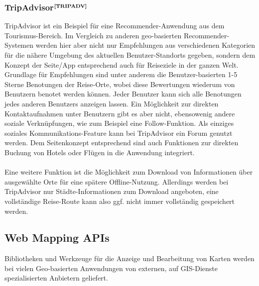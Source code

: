 \subsubsection[TripAdvisor]{TripAdvisor$^{\textbf{\ref{TRIPADV}}}$}%
\addtocounter{footnote}{1}
TripAdvisor ist ein Beispiel für eine Recommender-Anwendung aus dem Tourismus-Bereich. Im Vergleich zu anderen geo-basierten Recommender-Systemen werden hier aber nicht nur Empfehlungen aus verschiedenen Kategorien für die nähere Umgebung des aktuellen Benutzer-Standorts gegeben, sondern dem Konzept der Seite/App entsprechend auch für Reiseziele in der ganzen Welt.\\
Grundlage für Empfehlungen sind unter anderem die Benutzer-basierten 1-5 Sterne Benotungen der Reise-Orte, wobei diese Bewertungen wiederum von Benutzern benotet werden können. Jeder Benutzer kann sich alle Benotungen jedes anderen Benutzers anzeigen lassen. Ein Möglichkeit zur direkten Kontaktaufnahmen unter Benutzern gibt es aber nicht, ebensowenig andere soziale Verknüpfungen, wie zum Beispiel eine Follow-Funktion. Als einziges soziales Kommunikations-Feature kann bei TripAdvisor ein Forum genutzt werden. Dem Seitenkonzept entsprechend sind auch Funktionen zur direkten Buchung von Hotels oder Flügen in die Anwendung integriert.\\ \\
Eine weitere Funktion ist die Möglichkeit zum Download von Informationen über ausgewählte Orte für eine spätere Offline-Nutzung. Allerdings werden bei TripAdvisor nur Städte-Informationen zum Download angeboten, eine vollständige Reise-Route kann also ggf. nicht immer vollständig gespeichert werden.\\

\subsection{Web Mapping APIs}\label{3_WEBMAPAPIS}
Bibliotheken und Werkzeuge für die Anzeige und Bearbeitung von Karten werden bei vielen Geo-basierten Anwendungen von externen, auf GIS-Dienste spezialisierten Anbietern geliefert.

